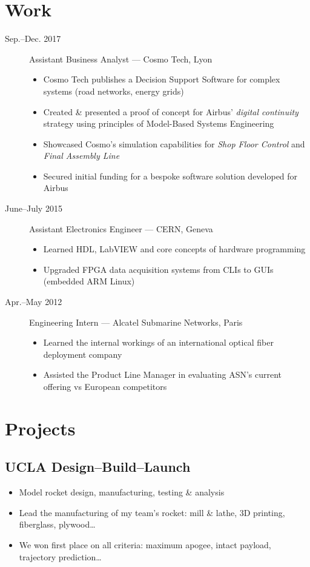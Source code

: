 \documentclass[11pt]{article}
\begin{document}
\section*{Work}
\label{sec:orgd88fe16}

\begin{description}
\item[{Sep.--Dec. 2017}] Assistant Business Analyst --- Cosmo Tech, Lyon
\begin{itemize}
\item Cosmo Tech publishes a Decision Support Software for complex systems (road networks, energy grids)
\item Created \& presented a proof of concept for Airbus' \textit{digital continuity} strategy using principles of Model-Based Systems Engineering
\item Showcased Cosmo’s simulation capabilities for \textit{Shop Floor Control} and \textit{Final Assembly Line}
\item Secured initial funding for a bespoke software solution developed for Airbus
\end{itemize}
\item[{June--July 2015}] Assistant Electronics Engineer --- CERN, Geneva
\begin{itemize}
\item Learned HDL, LabVIEW and core concepts of hardware programming
\item Upgraded FPGA data acquisition systems from CLIs to GUIs (embedded ARM Linux)
\end{itemize}
\item[{Apr.--May 2012}] Engineering Intern --- Alcatel Submarine Networks, Paris
\begin{itemize}
\item Learned the internal workings of an international optical fiber deployment company
\item Assisted the Product Line Manager in evaluating ASN's current offering vs European competitors
\end{itemize}
\end{description}

\section*{Projects}
\label{sec:orgd4b115a}
\subsection*{UCLA Design--Build--Launch}
\label{sec:org6fddb89}
\begin{itemize}
\item Model rocket design, manufacturing, testing \& analysis
\item Lead the manufacturing of my team's rocket: mill \& lathe, 3D printing, fiberglass, plywood\ldots{}
\item We won first place on all criteria: maximum apogee, intact payload, trajectory prediction\ldots{}
\end{itemize}
\end{document}

